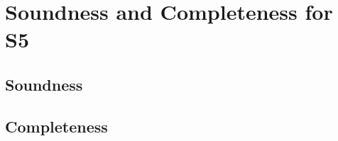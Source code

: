 \chapter{Soundness and Completeness for S5}\label{ch:s5}

\section{Soundness}\label{sec:s5-soundness}

\section{Completeness}\label{sec:s5-completeness}
